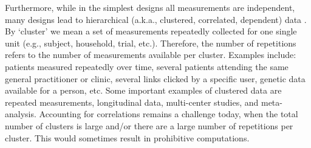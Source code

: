 \documentclass[14pt]{article}
\begin{document}
Furthermore, while in the simplest designs all measurements are independent, many designs lead to hierarchical (a.k.a., clustered, correlated, dependent) data \citep{laird1982,zeger1986,verbeke2009, molenberghs2005}. By `cluster' we mean a set of measurements repeatedly collected for one single unit (e.g., subject, household, trial, etc.). Therefore, the number of repetitions refers to the number of measurements available per cluster. Examples include: patients measured repeatedly over time, several patients attending the same general practitioner or clinic, several links clicked by a specific user, genetic data available for a person, etc. Some important examples of clustered data are repeated measurements, longitudinal data, multi-center studies, and meta-analysis. Accounting for correlations remains a challenge today, when the total number of clusters is large and/or there are a large number of repetitions per cluster. This would sometimes result in prohibitive computations. 
\end{document}
